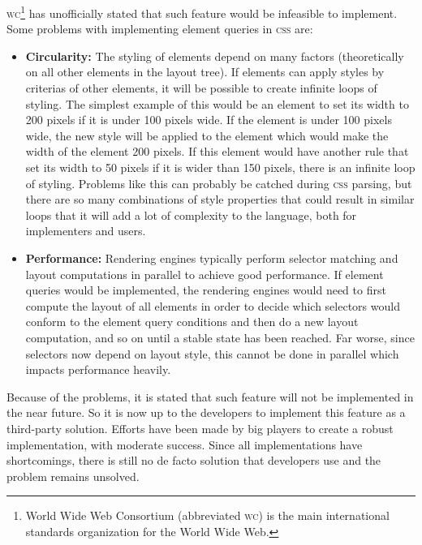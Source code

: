 \documentclass[oneside,a4paper,11pt]{kth-mag}
\begin{document}
\textsc{w}\textsc{c}\footnote{World Wide Web Consortium (abbreviated \textsc{w}\textsc{c}) is the main international standards organization for the World Wide Web.} has unofficially stated that such feature would be infeasible to implement. Some problems with implementing element queries in \textsc{css} are:
\begin{itemize}
    \item \textbf{Circularity:} The styling of elements depend on many factors (theoretically on all other elements in the layout tree). If elements can apply styles by criterias of other elements, it will be possible to create infinite loops of styling. The simplest example of this would be an element to set its width to 200 pixels if it is under 100 pixels wide. If the element is under 100 pixels wide, the new style will be applied to the element which would make the width of the element 200 pixels. If this element would have another rule that set its width to 50 pixels if it is wider than 150 pixels, there is an infinite loop of styling. Problems like this can probably be catched during \textsc{css} parsing, but there are so many combinations of style properties that could result in similar loops that it will add a lot of complexity to the language, both for implementers and users.
    \item \textbf{Performance:} Rendering engines typically perform selector matching and layout computations in parallel to achieve good performance. If element queries would be implemented, the rendering engines would need to first compute the layout of all elements in order to decide which selectors would conform to the element query conditions and then do a new layout computation, and so on until a stable state has been reached. Far worse, since selectors now depend on layout style, this cannot be done in parallel which impacts performance heavily.
\end{itemize}
Because of the problems, it is stated that such feature will not be implemented in the near future. So it is now up to the developers to implement this feature as a third-party solution. Efforts have been made by big players to create a robust implementation, with moderate success. Since all implementations have shortcomings, there is still no de facto solution that developers use and the problem remains unsolved.
\end{document}
